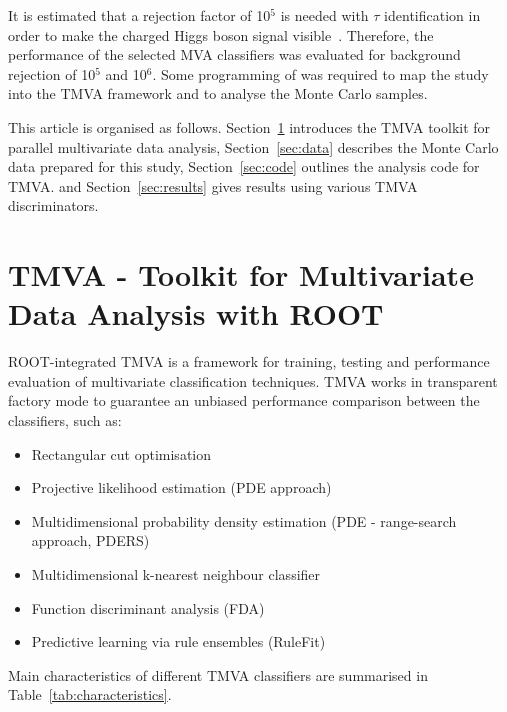 \documentclass[a4paper]{jpconf}
\begin{document}
It is estimated that a rejection factor of 10$^{5}$ is needed with
$\tau$ identification in order to make the charged Higgs boson signal
visible~\cite{ptdrII}. Therefore, the performance of the selected MVA
classifiers was evaluated for background rejection of 10$^{5}$ and 10$^{6}$. 
Some programming of was required to map the study into the TMVA framework 
and to analyse the Monte Carlo samples.

This article is organised as follows. 
Section~\ref{sec:tmva} introduces the TMVA toolkit for parallel multivariate data analysis,
Section~\ref{sec:data} describes the Monte Carlo data prepared for this study,
Section~\ref{sec:code} outlines the analysis code for TMVA.
and Section~\ref{sec:results} gives results using various TMVA discriminators.

\section{TMVA - Toolkit for Multivariate Data Analysis with ROOT}\label{sec:tmva}

ROOT-integrated TMVA is a framework for training, testing and performance evaluation
of multivariate classification techniques.
TMVA works in transparent factory mode 
to guarantee an unbiased performance comparison between the classifiers, such as:

\begin{itemize}
\item Rectangular cut optimisation
\item Projective likelihood estimation (PDE approach)
\item Multidimensional probability density estimation (PDE - range-search approach, PDERS)
\item Multidimensional k-nearest neighbour classifier
\item Function discriminant analysis (FDA)
\item Predictive learning via rule ensembles (RuleFit)
\end{itemize}
 
Main characteristics of different TMVA classifiers are summarised in Table~\ref{tab:characteristics}.
\end{document}

